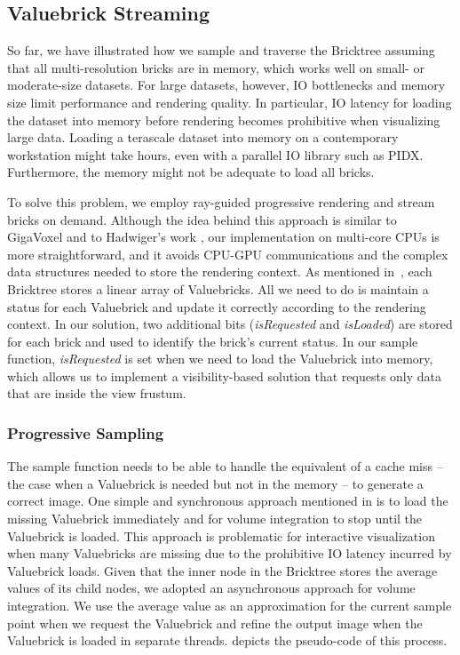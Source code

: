 \subsection{Valuebrick Streaming}
So far, we have illustrated how we sample and traverse the Bricktree assuming that all
multi-resolution bricks are in memory, which works well on small- or moderate-size datasets. 
For large datasets, however, IO bottlenecks and memory size limit performance and rendering
quality. In particular, IO latency for loading the dataset into memory before
rendering becomes prohibitive when visualizing large data. Loading a
terascale dataset into memory on a contemporary workstation might take hours, even with a parallel IO
library such as PIDX. Furthermore, the memory might not be adequate to load all bricks. 


To solve this problem, we employ ray-guided progressive rendering and stream bricks
on demand. Although the idea behind this approach is similar to GigaVoxel\cite{crassin2009gigavoxels}
and to Hadwiger's work \cite{hadwiger2012interactive}, our implementation on multi-core CPUs
is more straightforward, and it avoids CPU-GPU communications and the complex data structures
needed to store the rendering context. As mentioned in~,
each Bricktree stores a linear array of Valuebricks. All we need to do is maintain a
status for each Valuebrick and update it correctly according to the rendering context.
In our solution, two additional bits (\textit{isRequested} and \textit{isLoaded}) are stored 
for each brick and used to identify the brick's current status. In our sample function, 
\textit{isRequested} is set when we need to load the Valuebrick
into memory, which allows us to implement a visibility-based solution that requests only
data that are inside the view frustum. 




\subsubsection{Progressive Sampling}
The sample function needs to be able to handle the equivalent of a cache miss -- the case
when a Valuebrick is needed but not in the memory -- to generate a correct image.
One simple and synchronous approach mentioned in \cite{crassin2009gigavoxels} is to
load the missing Valuebrick immediately and for volume integration to stop until 
the Valuebrick is loaded. 
This approach is problematic for interactive visualization when many Valuebricks are missing 
due to the prohibitive IO latency incurred by Valuebrick loads. Given that the inner node
in the Bricktree stores the average values of its child nodes, we adopted an
asynchronous approach for volume integration. We use the average value as an
approximation for the current sample point when we request the Valuebrick and
refine the output image when the Valuebrick is loaded in separate threads. 
 depicts the pseudo-code of this process. 

